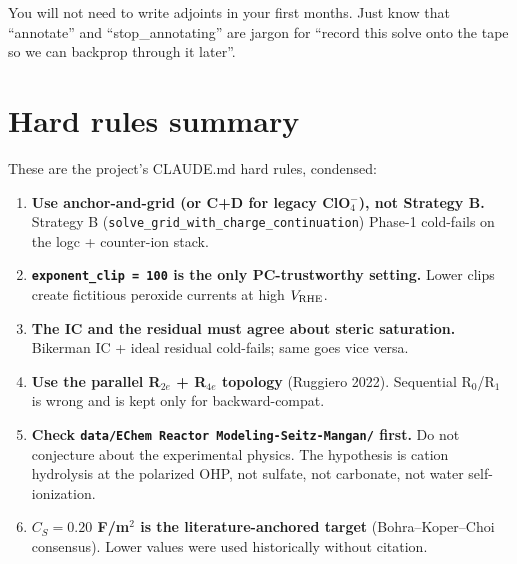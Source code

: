 \documentclass[11pt]{article}
\begin{document}
You will not need to write adjoints in your first months. Just know
that ``annotate'' and ``stop\_annotating'' are jargon for ``record
this solve onto the tape so we can backprop through it later''.

\section{Hard rules summary}

These are the project's CLAUDE.md hard rules, condensed:

\begin{enumerate}[leftmargin=*]
\item \textbf{Use anchor-and-grid (or C+D for legacy ClO$_4^-$),
      not Strategy B.} Strategy B
      (\texttt{solve\_grid\_with\_charge\_continuation}) Phase-1
      cold-fails on the logc + counter-ion stack.
\item \textbf{\texttt{exponent\_clip = 100} is the only
      PC-trustworthy setting.} Lower clips create fictitious
      peroxide currents at high $V_{\mathrm{RHE}}$.
\item \textbf{The IC and the residual must agree about steric
      saturation.} Bikerman IC + ideal residual cold-fails; same
      goes vice versa.
\item \textbf{Use the parallel R$_{2e}$ + R$_{4e}$ topology}
      (Ruggiero 2022). Sequential R$_0$/R$_1$ is wrong and is kept
      only for backward-compat.
\item \textbf{Check \texttt{data/EChem Reactor Modeling-Seitz-Mangan/}
      first.} Do not conjecture about the experimental physics.
      The hypothesis is cation hydrolysis at the polarized OHP, not
      sulfate, not carbonate, not water self-ionization.
\item \textbf{$C_S = 0.20$ F/m$^2$ is the literature-anchored
      target} (Bohra--Koper--Choi consensus). Lower values were
      used historically without citation.
\end{enumerate}

\onboardingfooter
\end{document}
